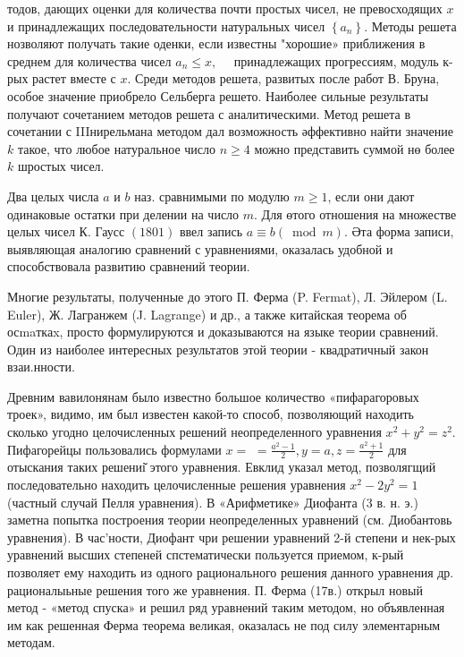 \documentclass[10pt]{article}
\begin{document}
тодов, дающих оценки для количества почти простых чисел, не превосходящих $x$ и принадлежащих последовательности натуральных чисел $\left\{a_{n}\right\}$. Методы решета нозволяют получать такие оденки, если известны "хорошие» приближения в среднем для количества чисел $a_{n} \leqslant x, \quad$ принадлежащих прогрессиям, модуль к-рых растет вместе с $x$. Среди методов решета, развитых после работ В. Бруна, особое значение приобрело Сельберга решето. Наиболее сильные результаты получают сочетанием методов решета с аналитическими. Метод решета в сочетании с IIIнирельмана методом дал возможность әффективно найти значение $k$ такое, что любое натуральное число $n \geqslant 4$ можно представить суммой нө более $k$ шростых чисел.



Два целых числа $a$ и $b$ наз. сравнимыми по модулю $m \geqslant 1$, если они дают одинаковые остатки при делении на число $m$. Для өтого отношения на множестве целых чисел К. Гаусс $(1801)$ ввел запись $a \equiv b(\bmod m)$. Әта форма записи, выявляющая аналогию сравнений с уравнениями, оказалась удобной и способствовала развитию сравнений теории.



Многие результаты, полученные до этого П. Ферма (P. Fermat), Л. Эйлером (L. Euler), Ж. Лагранжем (J. Lagrange) и др., а также китайская теорема об осmaткаx, просто формулируются и доказываются на языке теории сравнений. Один из наиболее интересных результатов этой теории - квадратичный закон взаи.нности.



Древним вавилонянам было известно большое количество «пифарагоровых троек», видимо, им был известен какой-то способ, позволяющий находить сколько угодно целочисленных решений неопределенного уравнения $x^{2}+y^{2}=z^{2}$. Пифагорейцы пользовались формулами $x=$ $=\frac{a^{2}-1}{2}, y=a, z=\frac{a^{2}+1}{2}$ для отыскания таких решениі̆ этого уравнения. Евклид указал метод, позволягщий последовательно находить целочисленные решения уравнения $x^{2}-2 y^{2}=1$ (частный случай Пелля уравнения). В «Арифметике» Диофанта (3 в. н. э.) заметна попытка построения теории неопределенных уравнений (см. Диобантовь уравнения). В час'ности, Диофант чри решении уравнений 2-й степени и нек-рых уравнений высших степеней спстематически пользуется приемом, к-рый позволяет ему находить из одного рационального решения данного уравнения др. рационалыьные решения того же уравнения. П. Ферма (17в.) открыл новый метод - «метод спуска» и решил ряд уравнений таким методом, но объявленная им как решенная Ферма теорема великая, оказалась не под силу элементарным методам.
\end{document}
